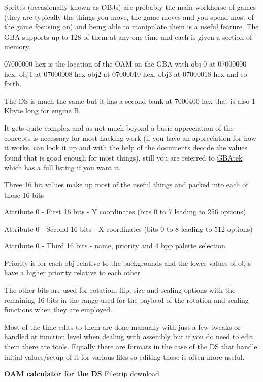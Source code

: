 \documentclass[
]{book}
\begin{document}
Sprites (occasionally known as OBJs) are probably the main workhorse of games (they are typically the things you move, the game moves and you spend most of the game focusing on) and being able to manipulate them is a useful feature. The GBA supports up to 128 of them at any one time and each is given a section of memory.

07000000 hex is the location of the OAM on the GBA with obj 0 at 07000000 hex, obj1 at 07000008 hex obj2 at 07000010 hex, obj3 at 07000018 hex and so forth.

The DS is much the same but it has a second bank at 7000400 hex that is also 1 Kbyte long for engine B.

It gets quite complex and as not much beyond a basic appreciation of the concepts is necessary for most hacking work (if you have an appreciation for how it works, can look it up and with the help of the documents decode the values found that is good enough for most things), still you are referred to \href{http://problemkaputt.de/gbatek.htm\#lcdobjoamattributes}{GBAtek} which has a full listing if you want it.

Three 16 bit values make up most of the useful things and packed into each of those 16 bits

Attribute 0 - First 16 bits - Y coordinates (bits 0 to 7 leading to 256 options)

Attribute 0 - Second 16 bits - X coordinates (bits 0 to 8 leading to 512 options)

Attribute 0 - Third 16 bits - name, priority and 4 bpp palette selection

Priority is for each obj relative to the backgrounds and the lower values of objs have a higher priority relative to each other.

The other bits are used for rotation, flip, size and scaling options with the remaining 16 bits in the range used for the payload of the rotation and scaling functions when they are employed.

Most of the time edits to them are done manually with just a few tweaks or handled at function level when dealing with assembly but if you do need to edit them there are tools. Equally there are formats in the case of the DS that handle initial values/setup of it for various files so editing those is often more useful.

\textbf{OAM calculator for the DS} \href{http://filetrip.net/nds-downloads/utilities/download-oam-calculator-10-f29054.html}{Filetrip download}
\end{document}
